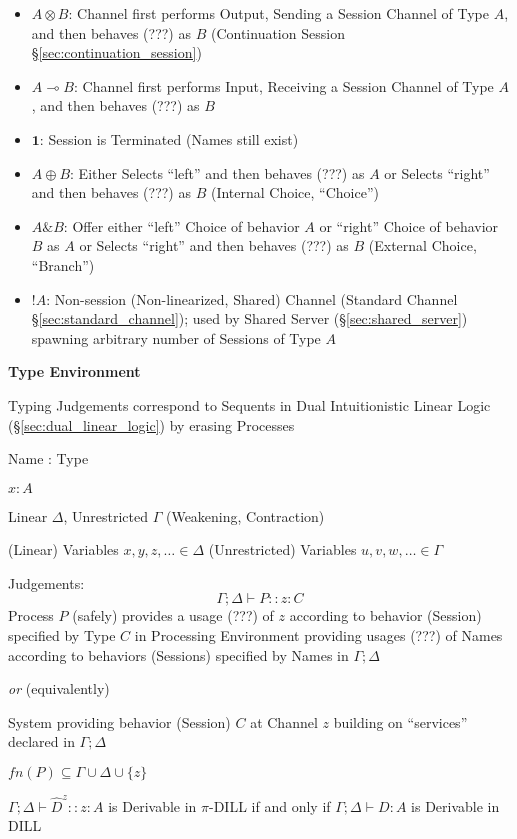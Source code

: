 \begin{itemize}
  \item $A \otimes B$: Channel first performs Output, Sending a
    Session Channel of Type $A$, and then behaves (???) as $B$
    (Continuation Session \S\ref{sec:continuation_session})
  \item $A \multimap B$: Channel first performs Input, Receiving a
    Session Channel of Type $A$, and then behaves (???) as $B$
  \item $\mathbf{1}$: Session is Terminated (Names still exist)
  \item $A \oplus B$: Either Selects ``left'' and then behaves (???)
    as $A$ or Selects ``right'' and then behaves (???) as $B$
    (Internal Choice, ``Choice'')
  \item $A \& B$: Offer either ``left'' Choice of behavior $A$ or
    ``right'' Choice of behavior $B$ as $A$ or Selects ``right'' and
    then behaves (???) as $B$ (External Choice, ``Branch'')
  \item $!A$: Non-session (Non-linearized, Shared) Channel (Standard
    Channel \S\ref{sec:standard_channel}); used by Shared Server
    (\S\ref{sec:shared_server}) spawning arbitrary number of Sessions
    of Type $A$
\end{itemize}


\textbf{Type Environment}
\cite{caires-pfenning10}

Typing Judgements correspond to Sequents in Dual Intuitionistic Linear
Logic (\S\ref{sec:dual_linear_logic}) by erasing Processes

Name : Type

$x : A$

Linear $\Delta$, Unrestricted $\Gamma$ (Weakening, Contraction)

(Linear) Variables $x,y,z,\ldots \in \Delta$
(Unrestricted) Variables $u,v,w,\ldots \in \Gamma$


Judgements:
\[
  \Gamma; \Delta \vdash P :: z:C
\]
Process $P$ (safely) provides a usage (???) of $z$ according to
behavior (Session) specified by Type $C$ in Processing Environment
providing usages (???) of Names according to behaviors (Sessions)
specified by Names in $\Gamma; \Delta$

\emph{or} (equivalently)

System providing behavior (Session) $C$ at Channel $z$ building on
``services'' declared in $\Gamma; \Delta$

$fn(P) \subseteq \Gamma \cup \Delta \cup \{z\}$

$\Gamma; \Delta \vdash \hat{D}^z :: z:A$ is Derivable in $\pi$-DILL if
and only if $\Gamma; \Delta \vdash D : A$ is Derivable in DILL


